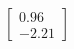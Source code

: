 \documentclass[preview]{standalone}
\begin{document}
\begin{align*}
\begin{bmatrix} 0.96 \\ -2.21 \end{bmatrix}
\end{align*}
\end{document}
